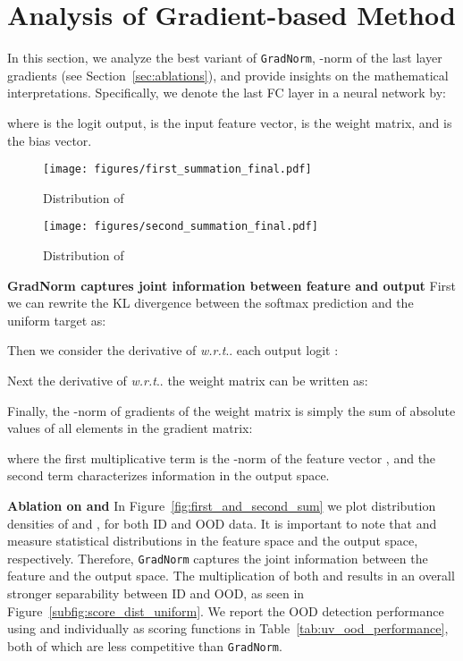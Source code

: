 \documentclass{article}
\makeatletter
\DeclareRobustCommand\onedot{\futurelet\@let@token\@onedot}
\def\@onedot{\ifx\@let@token.\else.\null\fi\xspace}
\def\wrt{\emph{w.r.t}\onedot} \def\dof{d.o.f\onedot}
\makeatother
\begin{document}
\section{Analysis of Gradient-based Method}
\label{sec:analysis}
In this section, we analyze the best variant of \texttt{GradNorm}, -norm of the last layer gradients (see Section~\ref{sec:ablations}), and provide insights on the mathematical interpretations.
Specifically, we denote the last FC layer in a neural network by: 

where  is the logit output,  is the input feature vector,  is the weight matrix, and  is the bias vector.




\begin{figure*}[t]
    \centering
    \begin{subfigure}{1\textwidth}
    \texttt{[image: figures/first\_summation\_final.pdf]}
    \caption{Distribution of  }
    \end{subfigure}
\begin{subfigure}{1\textwidth}
    \texttt{[image: figures/second\_summation\_final.pdf]}
    \caption{Distribution of }
    \end{subfigure}
    \caption{\small{We show the distributions of the two summations decomposed from the -norm of the last layer gradient, for both in-distribution data (blue) and out-of-distribution data (gray). }}
    \label{fig:first_and_second_sum}
\end{figure*}

\textbf{{GradNorm} captures joint information between feature and output} First we can rewrite the KL divergence between the softmax prediction and the uniform target as:


Then we consider the derivative of  \wrt each output logit :


Next the derivative of  \wrt the weight matrix can be written as:


Finally, the -norm of gradients of the weight matrix is simply the sum of absolute values of all elements in the gradient matrix:

where the first multiplicative term  is the -norm of the feature vector , and the second term  characterizes information in the output space. 


\textbf{Ablation on  and } In Figure~\ref{fig:first_and_second_sum} we plot distribution densities of  and , for both ID and OOD data. It is important to note that  and  measure statistical distributions in the feature space and the output space, respectively. Therefore, \texttt{GradNorm} captures the joint information between the feature and the output space. The multiplication of both  and  results in an overall stronger separability between ID and OOD, as seen in Figure~\ref{subfig:score_dist_uniform}. We report the OOD detection performance using  and  individually as scoring functions in Table~\ref{tab:uv_ood_performance}, both of which are less competitive than \texttt{GradNorm}.
\end{document}
